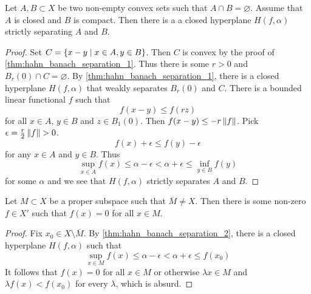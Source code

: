 \begin{theorem}\label{thm:hahn_banach_separation_2}
    Let $A, B\subset X$ be two non-empty convex sets such that $A\cap B = \varnothing$. 
    Assume that $A$ is closed and $B$ is compact. Then there is a 
    a closed hyperplane $H(f,\alpha)$ strictly separating $A$ and $B$.
\end{theorem}
\begin{proof}
    Set $C = \left\{ x-y \;\middle\vert\; x\in A, y\in B \right\}$. Then $C$ is convex by the proof 
    of \cref{thm:hahn_banach_separation_1}. Thus there is some $r>0$ 
    and $B_r(0)\cap C = \varnothing$. By \cref{thm:hahn_banach_separation_1}, 
    there is a closed hyperplane $H(f,\alpha)$ that weakly separates 
    $B_r(0)$ and $C$. There is a bounded linear functional $f$ such that 
    \begin{equation*}
        f(x-y) \leq f(rz)
    \end{equation*}
    for all $x\in A$, $y\in B$ and $z\in B_1(0)$. Then $f(x-y) \leq -r\left\lVert {f} \right\rVert$. 
    Pick $\epsilon = \frac{r}{2}\left\lVert {f} \right\rVert>0$. 
    \begin{equation*}
        f(x) + \epsilon \leq f(y) - \epsilon
    \end{equation*} 
    for any $x\in A$ and $y\in B$. Thus 
    \begin{equation*}
        \sup_{x\in A} f(x) \leq \alpha - \epsilon < \alpha + \epsilon \leq \inf_{y\in B} f(y)
    \end{equation*}
    for some $\alpha$ and we see that $H(f,\alpha)$ strictly separates $A$ and $B$.
\end{proof}

\begin{corollary}
    Let $M\subset X$ be a proper subspace such that $\overline{M} \neq X$. 
    Then there is some non-zero $f\in X'$ such that $f(x) = 0$ for all $x\in M$. 
\end{corollary}
\begin{proof}
    Fix $x_0\in X\setminus \overline{M}$. By \cref{thm:hahn_banach_separation_2}, 
    there is a closed hyperplane $H(f,\alpha)$ such that 
    \begin{equation*}
        \sup_{x\in M} f(x) \leq \alpha - \epsilon < \alpha + \epsilon \leq f(x_0)
    \end{equation*}
    It follows that $f(x) = 0$ for all $x\in M$ or otherwise $\lambda x\in M$ and 
    $\lambda f(x) < f(x_0)$ for every $\lambda$, which is absurd. 
\end{proof}